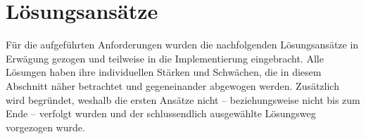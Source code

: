 \section{Lösungsansätze}
\label{sec:e_loesungsansaetze}

Für die aufgeführten Anforderungen wurden die nachfolgenden Lösungsansätze in
Erwägung gezogen und teilweise in die Implementierung eingebracht.  Alle
Lösungen haben ihre individuellen Stärken und Schwächen, die in diesem
Abschnitt näher betrachtet und gegeneinander abgewogen werden.  Zusätzlich wird
begründet, weshalb die ersten Ansätze nicht -- beziehungsweise nicht bis zum
Ende -- verfolgt wurden und der schlussendlich ausgewählte Lösungsweg
vorgezogen wurde.





